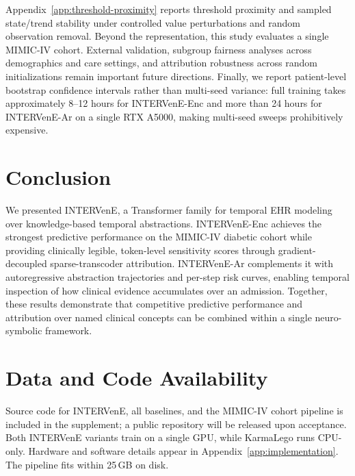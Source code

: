 \documentclass[letterpaper]{article} %
\begin{document}
Appendix~\ref{app:threshold-proximity} reports threshold proximity and sampled state/trend stability under controlled value perturbations and random observation removal. Beyond the representation, this study evaluates a single MIMIC-IV cohort. External validation, subgroup fairness analyses across demographics and care settings, and attribution robustness across random initializations remain important future directions. Finally, we report patient-level bootstrap confidence intervals rather than multi-seed variance: full training takes approximately 8--12 hours for INTERVenE-Enc and more than 24 hours for INTERVenE-Ar on a single RTX A5000, making multi-seed sweeps prohibitively expensive.

\section{Conclusion}

We presented INTERVenE, a Transformer family for temporal EHR modeling over knowledge-based temporal abstractions. INTERVenE-Enc achieves the strongest predictive performance on the MIMIC-IV diabetic cohort while providing clinically legible, token-level sensitivity scores through gradient-decoupled sparse-transcoder attribution. INTERVenE-Ar complements it with autoregressive abstraction trajectories and per-step risk curves, enabling temporal inspection of how clinical evidence accumulates over an admission. Together, these results demonstrate that competitive predictive performance and attribution over named clinical concepts can be combined within a single neuro-symbolic framework.

\section*{Data and Code Availability}
Source code for INTERVenE, all baselines, and the MIMIC-IV cohort pipeline is included in the supplement; a public repository will be released upon acceptance. Both INTERVenE variants train on a single GPU, while KarmaLego runs CPU-only. Hardware and software details appear in Appendix~\ref{app:implementation}. The pipeline fits within 25\,GB on disk.

\clearpage



\end{document}
